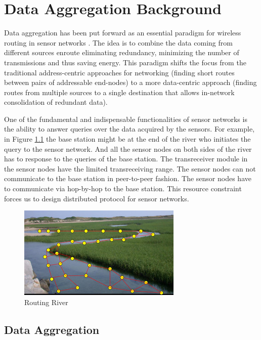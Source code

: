 \chapter{Data Aggregation Background} %
\label{cha:Data Aggregation Background}

	Data aggregation has been put forward as an essential paradigm for wireless routing in sensor networks \cite{krishnamachari2002impact}. 
	The idea is to combine the data coming from different sources enroute eliminating redundancy, minimizing the number of transmissions and thus saving energy.
	This paradigm shifts the focus from the traditional address-centric approaches for networking (finding short routes between pairs
	of addressable end-nodes) to a more data-centric approach (finding routes from multiple sources to a single destination that allows in-network consolidation of redundant data).

	One of the fundamental and indispensable functionalities of sensor networks is the ability to answer queries over the data acquired by the sensors. 
	For example, in Figure \ref{fig:Routing River} the base station might be at the end of the river who initiates the query to the sensor network.
	And all the sensor nodes on both sides of the river has to response to the queries of the base station.
	The transreceiver module in the sensor nodes have the limited transreceiving range. 
	The sensor nodes can not communicate to the base station in peer-to-peer fashion.
	The sensor nodes have to communicate via hop-by-hop to the base station.
	This resource constraint forces us to design distributed protocol for sensor networks.  
	\begin{figure}[h!]
		\centering
		\includegraphics[scale = 2]{images/routing-river.jpg}
		\caption{Routing River \cite{RoutingRiver}}
		\label{fig:Routing River}
	\end{figure}

\section{Data Aggregation}

